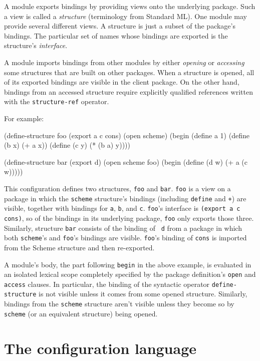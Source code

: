 A module exports bindings by providing views onto the underlying
package.  Such a view is called a {\em structure} (terminology from
Standard ML).  One module may provide several different views.  A
structure is just a subset of the package's bindings.  The particular
set of names whose bindings are exported is the structure's {\em
interface}.

A module imports bindings from other modules by either {\em opening}
or {\em accessing} some structures that are built on other packages.
When a structure is opened, all of its exported bindings are visible
in the client package.  On the other hand, bindings from an accessed
structure require explicitly qualified references written with the
{\tt structure-ref} operator.

For example:
\begin{example}
(define-structure foo (export a c cons)
  (open scheme)
  (begin (define a 1)
         (define (b x) (+ a x))
         (define (c y) (* (b a) y))))

(define-structure bar (export d)
  (open scheme foo)
  (begin (define (d w) (+ a (c w)))))
\end{example}
This configuration defines two structures, {\tt foo} and {\tt bar}.
{\tt foo} is a view on a package in which the {\tt scheme} structure's
bindings (including {\tt define} and {\tt +}) are visible, together
with bindings for {\tt a}, {\tt b},
and {\tt c}.  {\tt foo}'s interface is {\tt (export a c cons)}, so of
the bindings in its underlying package, {\tt foo} only exports those
three.  Similarly, structure {\tt bar} consists of the binding of {\tt
d} from a package in which both {\tt scheme}'s and {\tt foo}'s
bindings are visible.  {\tt foo}'s binding of {\tt cons} is imported
from the Scheme structure and then re-exported.

A module's body, the part following {\tt begin} in the above example,
is evaluated in an isolated lexical scope completely specified by the
package definition's {\tt open} and {\tt access} clauses.  In
particular, the binding of the syntactic operator {\tt define-structure}
is not visible unless it comes from some opened structure.  Similarly,
bindings from the {\tt scheme} structure aren't visible unless they
become so by {\tt scheme} (or an equivalent structure) being opened.


\section{The configuration language}

